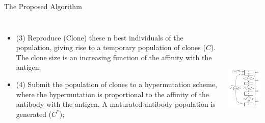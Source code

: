 \begin{frame}{The Proposed Algorithm}
\begin{columns}[c] 
\begin{itemize}
\item{(3) Reproduce (Clone) these n best individuals of the population, giving rise to a temporary population of clones (\begin{math} C \end{math}). The clone size is an increasing function of the affinity with the antigen;}
\item{(4) Submit the population of clones to a hypermutation scheme, where the hypermutation is proportional to the affinity of the antibody with the antigen. A maturated antibody population is generated (\begin{math} C^* \end{math});}
\end{itemize}
\includegraphics[height=6.5cm]{img/cj_block_diagram_CSA.png}
\end{columns}
\end{frame}


